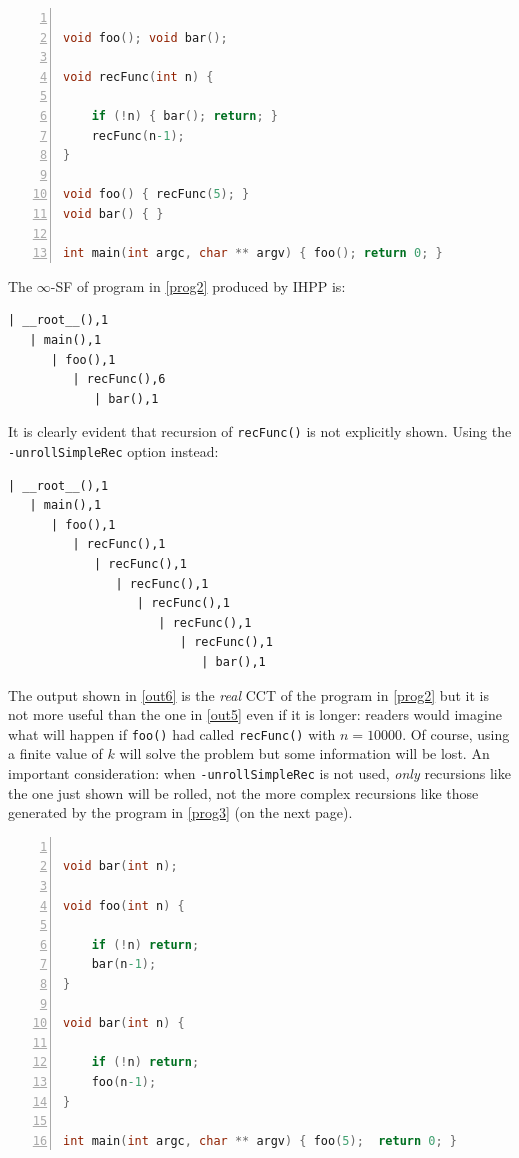 \documentclass[a4paper,10pt]{report}
\begin{document}
\begin{lstlisting}[language=C, 
	caption={prog2.c, a simple program that uses recursion}, 
	label=prog2, frame=leftline, numbers=left]

void foo(); void bar();

void recFunc(int n) {

	if (!n) { bar(); return; }
	recFunc(n-1);
}

void foo() { recFunc(5); }
void bar() { }

int main(int argc, char ** argv) { foo(); return 0; }

\end{lstlisting}

\noindent
The $\infty$-SF of program in \cref{prog2} produced by IHPP is:

\begin{lstlisting}[label=out5, caption={an example of $k$-SF \emph{without} the \texttt{unrollSimpleRec} option}, frame=bottomline]
| __root__(),1
   | main(),1
      | foo(),1
         | recFunc(),6
            | bar(),1
\end{lstlisting}

\noindent
It is clearly evident that recursion of \verb|recFunc()| is not explicitly shown.
Using the \verb|-unrollSimpleRec| option instead:
\begin{lstlisting}[label=out6, caption={an example of $k$-SF \emph{with} the \texttt{unrollSimpleRec} option}, frame=bottomline]
| __root__(),1
   | main(),1
      | foo(),1
         | recFunc(),1
            | recFunc(),1
               | recFunc(),1
                  | recFunc(),1
                     | recFunc(),1
                        | recFunc(),1
                           | bar(),1
\end{lstlisting}

\noindent
The output shown in \cref{out6} is the \emph{real} CCT of the program in \cref{prog2} 
but it is not more useful than the one in \cref{out5} even if it is longer: readers
would imagine what will happen if \verb|foo()| had called \verb|recFunc()| with $n=10000$. 
Of course, using a finite value of $k$ will solve the problem but some information will be lost. An important consideration: when \verb|-unrollSimpleRec| is not used, \emph{only} 
recursions like the one just shown will be rolled, not the more complex recursions like 
those generated by the program in \cref{prog3} (on the next page).

\begin{lstlisting}[language=C, 
	caption={prog3.c, a program that uses complex recursions}, label=prog3, 
	frame=leftline, numbers=left]

void bar(int n);

void foo(int n) {
	
	if (!n) return;
	bar(n-1);
}

void bar(int n) {

	if (!n) return;
	foo(n-1);
}

int main(int argc, char ** argv) { foo(5);	return 0; }

\end{lstlisting}
\end{document}
